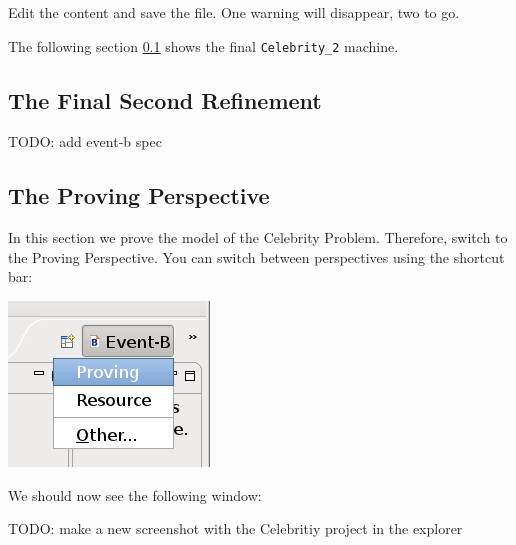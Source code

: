Edit the content and save the file. One warning will disappear, two to go.


The following section \ref{tut_08_final_celebrity} shows the final \texttt{Celebrity\_2} machine.

\subsection{The Final Second Refinement} \label{tut_08_final_celebrity}

TODO: add event-b spec

\subsection{The Proving Perspective}

In this section we prove the model of the Celebrity Problem. Therefore, switch to the Proving Perspective. You can switch between perspectives using the shortcut bar: 

\begin{center}
	\includegraphics{img/tutorial/tut_08_switch_perspective.png}
\end{center}


We should now see the following window: 

TODO: make a new screenshot with the Celebritiy project in the explorer

